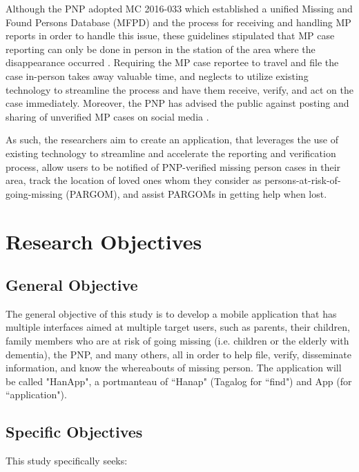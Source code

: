 Although the PNP adopted MC 2016-033 which established a unified Missing and Found Persons Database (MFPD) and the process for receiving and handling MP reports in order to handle this issue, these guidelines stipulated that MP case reporting can only be done in person in the station of the area where the disappearance occurred \cite{NationalPoliceCommission}. Requiring the MP case reportee to travel and file the case in-person takes away valuable time, and neglects to utilize existing technology to streamline the process and have them receive, verify, and act on the case immediately. Moreover, the PNP has advised the public against posting and sharing of unverified MP cases on social media \cite{madarang_2022}.

As such, the researchers aim to create an application, that leverages the use of existing technology to streamline and accelerate the reporting and verification process, allow users to be notified of PNP-verified missing person cases in their area, track the location of loved ones whom they consider as persons-at-risk-of-going-missing (PARGOM), and assist PARGOMs in getting help when lost. 



\section{Research Objectives}
\label{sec:researchobjectives}

\subsection{General Objective}
\label{sec:generalobjective}

The general objective of this study is to develop a mobile application that has multiple interfaces aimed at multiple target users, such as parents, their children, family members who are at risk of going missing (i.e. children or the elderly with dementia), the PNP, and many others, all in order to help file, verify, disseminate information, and know the whereabouts of missing person. The application will be called "HanApp", a portmanteau of ``Hanap" (Tagalog for ``find") and App (for ``application"). 

\subsection{Specific Objectives}
\label{sec:specificobjectives}

This study specifically seeks:

